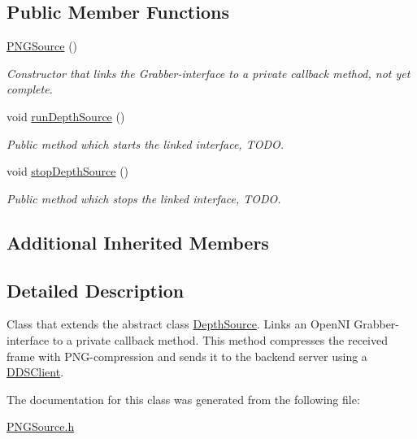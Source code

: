 \subsection*{Public Member Functions}
\begin{DoxyCompactItemize}
\item 
\hypertarget{class_p_n_g_source_a80cbf7148a3e0b74ea81f3d7186e04b2}{\hyperlink{class_p_n_g_source_a80cbf7148a3e0b74ea81f3d7186e04b2}{P\+N\+G\+Source} ()}\label{class_p_n_g_source_a80cbf7148a3e0b74ea81f3d7186e04b2}

\begin{DoxyCompactList}\small\item\em Constructor that links the Grabber-\/interface to a private callback method, not yet complete. \end{DoxyCompactList}\item 
\hypertarget{class_p_n_g_source_a4171d08534f408035e5deacea15b0aba}{void \hyperlink{class_p_n_g_source_a4171d08534f408035e5deacea15b0aba}{run\+Depth\+Source} ()}\label{class_p_n_g_source_a4171d08534f408035e5deacea15b0aba}

\begin{DoxyCompactList}\small\item\em Public method which starts the linked interface, T\+O\+D\+O. \end{DoxyCompactList}\item 
\hypertarget{class_p_n_g_source_a4813ea8d8d30be53f213c8c9d79d101a}{void \hyperlink{class_p_n_g_source_a4813ea8d8d30be53f213c8c9d79d101a}{stop\+Depth\+Source} ()}\label{class_p_n_g_source_a4813ea8d8d30be53f213c8c9d79d101a}

\begin{DoxyCompactList}\small\item\em Public method which stops the linked interface, T\+O\+D\+O. \end{DoxyCompactList}\end{DoxyCompactItemize}
\subsection*{Additional Inherited Members}


\subsection{Detailed Description}
Class that extends the abstract class \hyperlink{class_depth_source}{Depth\+Source}. Links an Open\+N\+I Grabber-\/interface to a private callback method. This method compresses the received frame with P\+N\+G-\/compression and sends it to the backend server using a \hyperlink{class_d_d_s_client}{D\+D\+S\+Client}. 

The documentation for this class was generated from the following file\+:\begin{DoxyCompactItemize}
\item 
\hyperlink{_p_n_g_source_8h}{P\+N\+G\+Source.\+h}\end{DoxyCompactItemize}
